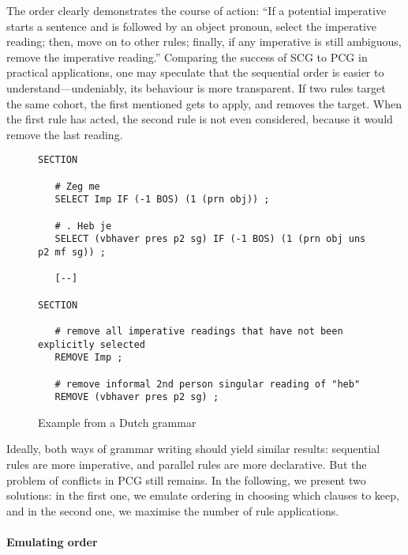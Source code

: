 The order clearly demonstrates the course of action: ``If a potential imperative starts a sentence and is followed by an object pronoun, select the imperative reading; then, move on to other rules; finally, if any imperative is still ambiguous, remove the imperative reading.'' 
Comparing the success of SCG to PCG in practical applications, one may speculate that the sequential order is easier to understand---undeniably, its behaviour is more transparent. %
If two rules target the same cohort, the first mentioned gets to apply, and removes the target. When the first rule has acted, the second rule is not even considered, because it would remove the last reading.




\begin{figure}[ht]
\centering
   \begin{verbatim}
SECTION

   # Zeg me
   SELECT Imp IF (-1 BOS) (1 (prn obj)) ;

   # . Heb je
   SELECT (vbhaver pres p2 sg) IF (-1 BOS) (1 (prn obj uns p2 mf sg)) ;

   [--]

SECTION

   # remove all imperative readings that have not been explicitly selected
   REMOVE Imp ;

   # remove informal 2nd person singular reading of "heb"
   REMOVE (vbhaver pres p2 sg) ;

   \end{verbatim}
\caption{Example from a Dutch grammar}
\label{fig:ruleOrder}
\end{figure}


Ideally, both ways of grammar writing should yield similar results:
sequential \onlycg{} rules are more imperative, and parallel \onlycg{} rules are more declarative.
But the problem of conflicts in PCG still remains. 
In the following, we present two solutions: 
in the first one, we emulate ordering in choosing which clauses to keep, and in the second one, we maximise the number of rule applications. 



\paragraph{Emulating order} 

